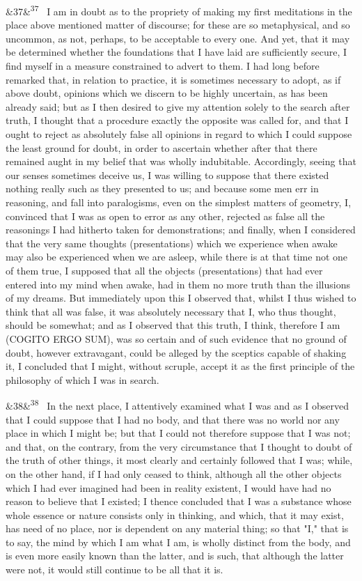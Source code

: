 \documentclass[12pt]{article}
\newcommand{\para}[1][]{\par\noindent\ifx&#1&\else\textsuperscript{\footnotesize #1}~\fi}
\begin{document}
\para[37] I am in doubt as to the propriety of making my first meditations in the place above mentioned matter of discourse; for these are so metaphysical, and so uncommon, as not, perhaps, to be acceptable to every one. And yet, that it may be determined whether the foundations that I have laid are sufficiently secure, I find myself in a measure constrained to advert to them. I had long before remarked that, in relation to practice, it is sometimes necessary to adopt, as if above doubt, opinions which we discern to be highly uncertain, as has been already said; but as I then desired to give my attention solely to the search after truth, I thought that a procedure exactly the opposite was called for, and that I ought to reject as absolutely false all opinions in regard to which I could suppose the least ground for doubt, in order to ascertain whether after that there remained aught in my belief that was wholly indubitable. Accordingly, seeing that our senses sometimes deceive us, I was willing to suppose that there existed nothing really such as they presented to us; and because some men err in reasoning, and fall into paralogisms, even on the simplest matters of geometry, I, convinced that I was as open to error as any other, rejected as false all the reasonings I had hitherto taken for demonstrations; and finally, when I considered that the very same thoughts (presentations) which we experience when awake may also be experienced when we are asleep, while there is at that time not one of them true, I supposed that all the objects (presentations) that had ever entered into my mind when awake, had in them no more truth than the illusions of my dreams. But immediately upon this I observed that, whilst I thus wished to think that all was false, it was absolutely necessary that I, who thus thought, should be somewhat; and as I observed that this truth, I think, therefore I am (COGITO ERGO SUM), was so certain and of such evidence that no ground of doubt, however extravagant, could be alleged by the sceptics capable of shaking it, I concluded that I might, without scruple, accept it as the first principle of the philosophy of which I was in search.

\para[38] In the next place, I attentively examined what I was and as I observed that I could suppose that I had no body, and that there was no world nor any place in which I might be; but that I could not therefore suppose that I was not; and that, on the contrary, from the very circumstance that I thought to doubt of the truth of other things, it most clearly and certainly followed that I was; while, on the other hand, if I had only ceased to think, although all the other objects which I had ever imagined had been in reality existent, I would have had no reason to believe that I existed; I thence concluded that I was a substance whose whole essence or nature consists only in thinking, and which, that it may exist, has need of no place, nor is dependent on any material thing; so that "I," that is to say, the mind by which I am what I am, is wholly distinct from the body, and is even more easily known than the latter, and is such, that although the latter were not, it would still continue to be all that it is.
\end{document}
